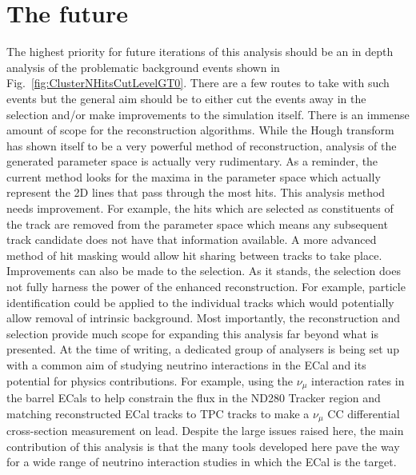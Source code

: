 \section{The future}
\label{sec:TheFuture}
The highest priority for future iterations of this analysis should be an in depth analysis of the problematic background events shown in Fig.~\ref{fig:ClusterNHitsCutLevelGT0}.  There are a few routes to take with such events but the general aim should be to either cut the events away in the selection and/or make improvements to the simulation itself.
\newline
\newline
There is an immense amount of scope for the reconstruction algorithms.  While the Hough transform has shown itself to be a very powerful method of reconstruction, analysis of the generated parameter space is actually very rudimentary.  As a reminder, the current method looks for the maxima in the parameter space which actually represent the 2D lines that pass through the most hits.  This analysis method needs improvement.  For example, the hits which are selected as constituents of the track are removed from the parameter space which means any subsequent track candidate does not have that information available.  A more advanced method of hit masking would allow hit sharing between tracks to take place.  
\newline
\newline
Improvements can also be made to the selection.  As it stands, the selection does not fully harness the power of the enhanced reconstruction.  For example, particle identification could be applied to the individual tracks which would potentially allow removal of intrinsic background.
\newline
\newline
Most importantly, the reconstruction and selection provide much scope for expanding this analysis far beyond what is presented.  At the time of writing, a dedicated group of analysers is being set up with a common aim of studying neutrino interactions in the ECal and its potential for physics contributions.  For example, using the $\nu_\mu$ interaction rates in the barrel ECals to help constrain the flux in the ND280 Tracker region and matching reconstructed ECal tracks to TPC tracks to make a $\nu_\mu$ CC differential cross-section measurement on lead.
\newline
\newline
Despite the large issues raised here, the main contribution of this analysis is that the many tools developed here pave the way for a wide range of neutrino interaction studies in which the ECal is the target.







